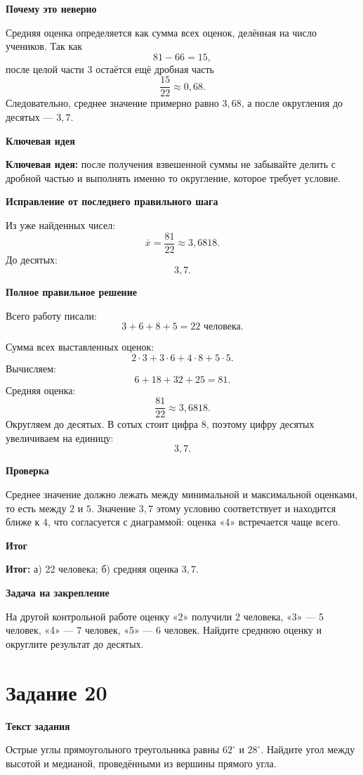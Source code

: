 \documentclass[12pt,a4paper]{article}
\newcommand{\keyidea}{\textcolor{blue!60!black}{\textbf{Ключевая идея:}}}
\newcommand{\resultlabel}{\textcolor{teal!60!black}{\textbf{Итог:}}}
\newcommand{\subhead}[1]{\par\medskip\textbf{#1}\par}
\begin{document}
\subhead{Почему это неверно}
Средняя оценка определяется как сумма всех оценок, делённая на число учеников. Так как
\[
81-66=15,
\]
после целой части $3$ остаётся ещё дробная часть
\[
\frac{15}{22}\approx0{,}68.
\]
Следовательно, среднее значение примерно равно $3{,}68$, а после округления до десятых --- $3{,}7$.

\subhead{Ключевая идея}
\keyidea{} после получения взвешенной суммы не забывайте делить с дробной частью и выполнять именно то округление, которое требует условие.

\subhead{Исправление от последнего правильного шага}
Из уже найденных чисел:
\[
\overline{x}=\frac{81}{22}\approx3{,}6818.
\]
До десятых:
\[
3{,}7.
\]

\subhead{Полное правильное решение}
Всего работу писали:
\[
3+6+8+5=22\text{ человека}.
\]

Сумма всех выставленных оценок:
\[
2\cdot3+3\cdot6+4\cdot8+5\cdot5.
\]
Вычисляем:
\[
6+18+32+25=81.
\]
Средняя оценка:
\[
\frac{81}{22}\approx3{,}6818.
\]
Округляем до десятых. В сотых стоит цифра $8$, поэтому цифру десятых увеличиваем на единицу:
\[
3{,}7.
\]

\subhead{Проверка}
Среднее значение должно лежать между минимальной и максимальной оценками, то есть между $2$ и $5$. Значение $3{,}7$ этому условию соответствует и находится ближе к $4$, что согласуется с диаграммой: оценка «4» встречается чаще всего.

\subhead{Итог}
\resultlabel{} а) 22 человека; б) средняя оценка $3{,}7$.

\subhead{Задача на закрепление}
На другой контрольной работе оценку «2» получили 2 человека, «3» --- 5 человек, «4» --- 7 человек, «5» --- 6 человек. Найдите среднюю оценку и округлите результат до десятых.

\newpage
{}\label{task:20}
\section*{Задание 20}

\subhead{Текст задания}
Острые углы прямоугольного треугольника равны $62^\circ$ и $28^\circ$. Найдите угол между высотой и медианой, проведёнными из вершины прямого угла.
\end{document}
